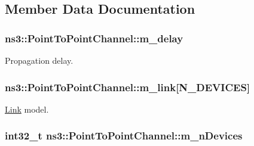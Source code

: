 \subsection{Member Data Documentation}
\subsubsection[{\texorpdfstring{m\+\_\+delay}{m_delay}}]{ ns3\+::\+Point\+To\+Point\+Channel\+::m\+\_\+delay\hspace{0.3cm}{\ttfamily [private]}}\hypertarget{classns3_1_1PointToPointChannel_abaf8b917578c2ff90629cf663db47412}{}\label{classns3_1_1PointToPointChannel_abaf8b917578c2ff90629cf663db47412}


Propagation delay. 

\subsubsection[{\texorpdfstring{m\+\_\+link}{m_link}}]{ ns3\+::\+Point\+To\+Point\+Channel\+::m\+\_\+link\mbox{[}{\bf N\+\_\+\+D\+E\+V\+I\+C\+ES}\mbox{]}\hspace{0.3cm}{\ttfamily [private]}}\hypertarget{classns3_1_1PointToPointChannel_a3f58f5090b715716f8f278bf5482a7aa}{}\label{classns3_1_1PointToPointChannel_a3f58f5090b715716f8f278bf5482a7aa}


\hyperlink{classns3_1_1PointToPointChannel_1_1Link}{Link} model. 

\subsubsection[{\texorpdfstring{m\+\_\+n\+Devices}{m_nDevices}}]{\setlength{\rightskip}{0pt plus 5cm}int32\+\_\+t ns3\+::\+Point\+To\+Point\+Channel\+::m\+\_\+n\+Devices\hspace{0.3cm}{\ttfamily [private]}}\hypertarget{classns3_1_1PointToPointChannel_a1eb8bdbc8340e051b43275bd0932185d}{}\label{classns3_1_1PointToPointChannel_a1eb8bdbc8340e051b43275bd0932185d}


